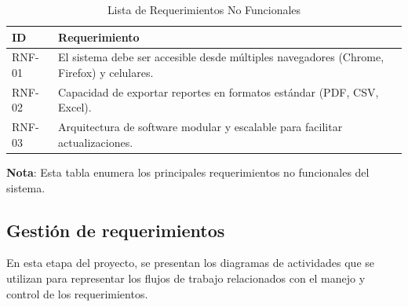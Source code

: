 	\begin{longtable}{m{1.4cm} m{14.5cm}}
		\caption[Lista de Requerimientos No Funcionales]{\newline Lista de Requerimientos No Funcionales} \label{tab:tabla_requerimientos_nofuncionales}\\
		\toprule
		\textbf{ID} & \textbf{Requerimiento} \\
		\midrule
		\endfirsthead		
		\bottomrule
		\endlastfoot
		
		RNF-01 & El sistema debe ser accesible desde múltiples navegadores (Chrome, Firefox) y celulares. \\
		RNF-02 & Capacidad de exportar reportes en formatos estándar (PDF, CSV, Excel). \\
		RNF-03 & Arquitectura de software modular y escalable para facilitar actualizaciones. \\
		
	\end{longtable}
	\endgroup
	
	\vspace{-18pt}
	\textbf{Nota}: Esta tabla enumera los principales requerimientos no funcionales del sistema.
		
	\subsection{Gestión de requerimientos}
	En esta etapa del proyecto, se presentan los diagramas de actividades que se utilizan para representar los flujos de trabajo relacionados con el manejo y control de los requerimientos. 
	

	
